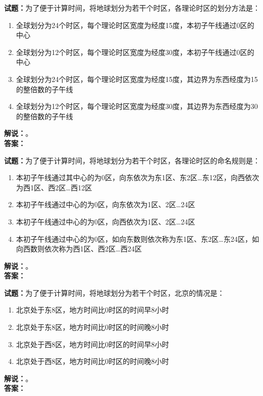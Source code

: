 \documentclass{ctexbook}
\begin{document}
\noindent\textbf{试题：}为了便于计算时间，将地球划分为若干个时区，各理论时区的划分方法是：
\begin{enumerate}[leftmargin=3em]
  \item 全球划分为24个时区，每个理论时区宽度为经度15度，本初子午线通过0区的中心
  \item 全球划分为12个时区，每个理论时区宽度为经度30度，本初子午线通过0区的中心
  \item 全球划分为24个时区，每个理论时区宽度为经度15度，其边界为东西经度为15的整倍数的子午线
  \item 全球划分为12个时区，每个理论时区宽度为经度30度，其边界为东西经度为30的整倍数的子午线
\end{enumerate}
\noindent\textbf{解说：}\textbf{}。\\\noindent\textbf{答案：}

\bigskip

\noindent\textbf{试题：}为了便于计算时间，将地球划分为若干个时区，各理论时区的命名规则是：
\begin{enumerate}[leftmargin=3em]
  \item 本初子午线通过其中心的为0区，向东依次为东1区、东2区…东12区，向西依次为西1区、西2区…西12区
  \item 本初子午线通过中心的为0区，向东依次为1区、2区…24区
  \item 本初子午线通过中心的为0区，向西依次为1区、2区…24区
  \item 本初子午线通过中心的为0区，如向东数则依次称为东1区、东2区…东24区，如向西数则依次称为西1区、西2区…西24区
\end{enumerate}
\noindent\textbf{解说：}\textbf{}。\\\noindent\textbf{答案：}

\bigskip

\noindent\textbf{试题：}为了便于计算时间，将地球划分为若干个时区，北京的情况是：
\begin{enumerate}[leftmargin=3em]
  \item 北京处于东8区，地方时间比0时区的时间早8小时
  \item 北京处于东8区，地方时间比0时区的时间晚8小时
  \item 北京处于西8区，地方时间比0时区的时间早8小时
  \item 北京处于西8区，地方时间比0时区的时间晚8小时
\end{enumerate}
\noindent\textbf{解说：}\textbf{}。\\\noindent\textbf{答案：}

\bigskip
\end{document}
